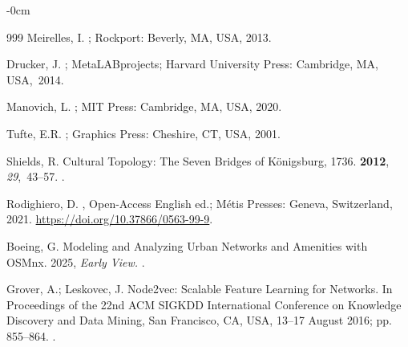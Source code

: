 \documentclass[land,article,accept,pdftex,oneauthor]{Definitions/mdpi}
\begin{document}
{\begin{adjustwidth}{-\extralength}{0cm}
\begin{thebibliography}{999}
Meirelles, I.
;
  Rockport: Beverly, MA, USA, 2013. %

Drucker, J.
;
  {MetaLABprojects}; Harvard University Press:  {Cambridge, MA, USA,}~2014.

Manovich, L.
; MIT Press: Cambridge, MA, USA, 2020. %

Tufte, E.R.
;
  Graphics Press: Cheshire, CT, USA, 2001.

Shields, R.
\newblock Cultural {Topology}: {The} {Seven} {Bridges} of {Königsburg}, 1736.
 {\bf 2012}, {\em 29},~43--57.
.

Rodighiero, D.
,
  Open-Access English ed.; Métis Presses: Geneva, Switzerland,  {2021.} %
\newblock \url{https://doi.org/10.37866/0563-99-9}. 

Boeing, G.
\newblock Modeling and {Analyzing} {Urban} {Networks} and {Amenities} {with}
  {OSMnx}.
 {2025}, \emph{{Early View.}} %
.

Grover, A.; Leskovec, J.
\newblock Node2vec: {Scalable} {Feature} {Learning} for {Networks}.
\newblock In Proceedings of the 22nd {ACM} {SIGKDD}
  {International} {Conference} on {Knowledge} {Discovery} and {Data} {Mining},
  San Francisco, CA, USA,   {13--17 August} %
 2016; pp. 855--864.
.


\end{thebibliography}
\end{adjustwidth}}
\end{document}
